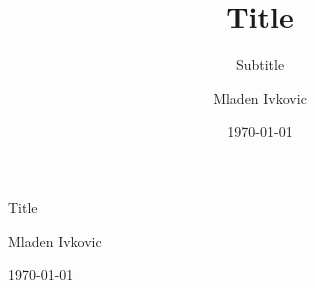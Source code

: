 \title{Title}
\subtitle{Subtitle}
\author{Mladen Ivkovic}
\date{\today}







\begin{titlepage}


\null\vspace{2cm}
{\huge
    \noindent
    Title
}



\vspace{1cm}

\vspace{8cm}

Mladen Ivkovic

\today

\end{titlepage}

\cleardoubleemptypage

